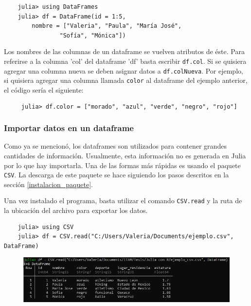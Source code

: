 \begin{verbatim}
	julia> using DataFrames
    julia> df = DataFrame(id = 1:5, 
   		nombre = ["Valeria", "Paula", "María José", 
        		"Sofía", "Mónica"])
\end{verbatim}

Los nombres de las columnas de un dataframe se vuelven atributos de éste. Para referirse a la columna 'col' del dataframe 'df' basta escribir \texttt{df.col}. Si se quisiera agregar una columna nueva se deben asignar datos a \texttt{df.colNueva}. Por ejemplo, si quisiera agregar una columna llamada \texttt{color} al dataframe del ejemplo anterior, el código sería el siguiente: 

\begin{verbatim}
     julia> df.color = ["morado", "azul", "verde", "negro", "rojo"]
\end{verbatim}

\subsubsection{Importar datos en un dataframe}

Como ya se mencionó, los dataframes son utilizados para contener grandes cantidades de información. Usualmente, esta información no es generada en \textsf{Julia} por lo que hay importarla. Una de las formas más rápidas es usando el paquete \texttt{CSV}. La descarga de este paquete se hace siguiendo  los pasos descritos en la sección \ref{instalacion_paquete}. 

Una vez instalado el programa, basta utilizar el comando \texttt{CSV.read} y la ruta de la ubicación del archivo para exportar los datos. 

\begin{verbatim}
	julia> using CSV
    julia> df = CSV.read("C:/Users/Valeria/Documents/ejemplo.csv", DataFrame)
\end{verbatim}


\begin{figure}[h]
\begin{center}
\includegraphics[scale=0.6]{Imagenes/insertar_df.JPG}
  \label{insertar_df}
\end{center}
\end{figure}


